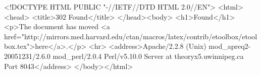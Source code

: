 <!DOCTYPE HTML PUBLIC "-//IETF//DTD HTML 2.0//EN">
<html><head>
<title>302 Found</title>
</head><body>
<h1>Found</h1>
<p>The document has moved <a href="http://mirrors.med.harvard.edu/ctan/macros/latex/contrib/etoolbox/etoolbox.tex">here</a>.</p>
<hr>
<address>Apache/2.2.8 (Unix) mod_apreq2-20051231/2.6.0 mod_perl/2.0.4 Perl/v5.10.0 Server at theoryx5.uwinnipeg.ca Port 8043</address>
</body></html>
